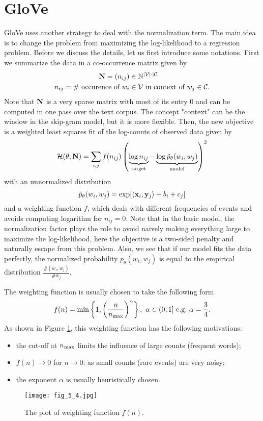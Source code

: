 \documentclass[../book-template.tex]{subfiles}
\begin{document}
\section{GloVe}\label{sec_5_glove}
GloVe uses another strategy to deal with the normalization term. The main idea is to change the problem from maximizing the log-likelihood to a regression problem. Before we discuss the details, let us first introduce some notations. First we summarize the data in a co-occurrence matrix given by
\begin{align*}
	{\bf N}=(n_{ij})&\in \mathbb{N}^{|\mathcal{V}|\cdot |\mathcal{C}|}\\
	n_{ij} = \text{\# occurence of }w_{i}&\in\mathcal{V}\text{ in context of }w_j\in \mathcal{C}.
\end{align*}
Note that ${\bf N}$ is a very sparse matrix with most of its entry $0$ and can be computed in one pass over the text corpus. The concept "context" can be the window in the skip-gram model, but it is more flexible. Then, the new objective is a weighted least squares fit of the log-counts of observed data given by
\begin{equation}\label{eq_5_glv_obj}
	\mathcal{H}(\theta;{\bf N})=\sum_{i,j}f(n_{ij})\left(\underbrace{\log n_{ij}}_{\text{target}}-\underbrace{\log \tilde{p}_\theta(w_i,w_j)}_{\text{model}}\right)^2
\end{equation}
with an unnormalized distribution
\begin{equation*}
	\tilde{p}_{\theta}(w_i,w_j)=\exp[\langle {\bf x}_i,{\bf y}_j\rangle +b_i+c_j]
\end{equation*}
and a weighting function $f$, which deals with different frequencies of events and avoids computing logarithm for $n_{ij}=0$. Note that in the basic model, the normalization factor plays the role to avoid naively making everything large to maximize the log-likelihood, here the objective is a two-sided penalty and naturally escape from this problem. Also, we see that if our model fits the data perfectly, the normalized probability $p_{\theta}(w_i,w_j)$ is equal to the empirical distribution $\frac{\# (w_i,w_j)}{\# w_j}$.
\par The weighting function is usually chosen to take the following form
\begin{equation*}
	f(n)={\rm min}\left\{1,\left(\frac{n}{n_{\rm max}}\right)^{\alpha}\right\},\ \alpha\in (0,1]\ {\rm e.g.}\ \alpha=\frac{3}{4}.
\end{equation*}
As shown in Figure \ref{fig_5_4}, this weighting function has the following motivations:
\begin{itemize}
	\item the cut-off at $n_{\rm max}$ limits the influence of large counts (frequent words);
	\item $f(n)\rightarrow 0$ for $n\rightarrow 0$: as small counts (rare events) are very noisy;
	\item the exponent $\alpha$ is usually heuristically chosen.
\end{itemize}
\begin{figure}[h] 
	\centering 
	\texttt{[image: fig\_5\_4.jpg]} 
	\caption{The plot of weighting function $f(n)$.}\label{fig_5_4}
\end{figure}
\end{document}
